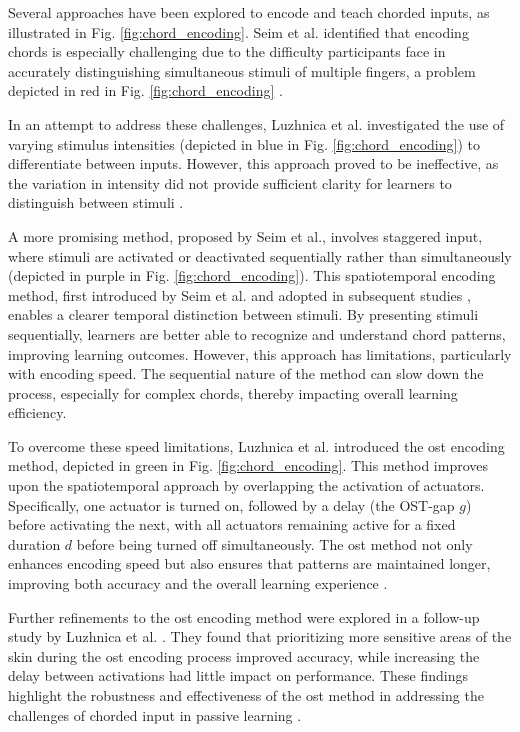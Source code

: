 Several approaches have been explored to encode and teach chorded inputs, as illustrated in Fig. \autoref{fig:chord_encoding}. Seim et al. identified that encoding chords is especially challenging due to the difficulty participants face in accurately distinguishing simultaneous stimuli of multiple fingers, a problem depicted in red in Fig. \autoref{fig:chord_encoding} \cite{Seim2014, Seim2015}. 

In an attempt to address these challenges, Luzhnica et al. investigated the use of varying stimulus intensities (depicted in blue in Fig. \autoref{fig:chord_encoding}) to differentiate between inputs. However, this approach proved to be ineffective, as the variation in intensity did not provide sufficient clarity for learners to distinguish between stimuli \cite{Luzhnica2017}.

A more promising method, proposed by Seim et al., involves staggered input, where stimuli are activated or deactivated sequentially rather than simultaneously (depicted in purple in Fig. \autoref{fig:chord_encoding}). This spatiotemporal encoding method, first introduced by Seim et al. \cite{Seim2014a} and adopted in subsequent studies \cite{Seim2014}, enables a clearer temporal distinction between stimuli. By presenting stimuli sequentially, learners are better able to recognize and understand chord patterns, improving learning outcomes. However, this approach has limitations, particularly with encoding speed. The sequential nature of the method can slow down the process, especially for complex chords, thereby impacting overall learning efficiency.

To overcome these speed limitations, Luzhnica et al. introduced the \gls{ost} encoding method, depicted in green in Fig. \autoref{fig:chord_encoding}. This method improves upon the spatiotemporal approach by overlapping the activation of actuators. Specifically, one actuator is turned on, followed by a delay (the OST-gap $g$) before activating the next, with all actuators remaining active for a fixed duration $d$ before being turned off simultaneously. The \gls{ost} method not only enhances encoding speed but also ensures that patterns are maintained longer, improving both accuracy and the overall learning experience \cite{Luzhnica2018, Luzhnica2018a, Luzhnica2017, Luzhnica2016}.

Further refinements to the \gls{ost} encoding method were explored in a follow-up study by Luzhnica et al. \cite{Luzhnica2017}. They found that prioritizing more sensitive areas of the skin during the \gls{ost} encoding process improved accuracy, while increasing the delay between activations had little impact on performance. These findings highlight the robustness and effectiveness of the \gls{ost} method in addressing the challenges of chorded input in passive learning \cite{Luzhnica2017}.



